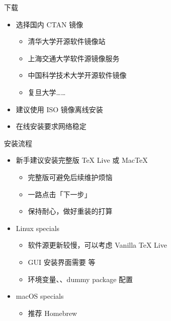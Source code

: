 \begin{frame}{下载}
\begin{itemize}
  \item 选择国内 CTAN 镜像

    \begin{itemize}
      \item 清华大学开源软件镜像站 
      \item 上海交通大学软件源镜像服务 
      \item 中国科学技术大学开源软件镜像  \pause
      \item 复旦大学……
    \end{itemize} \pause

  \item 建议使用 ISO 镜像离线安装
  \item 在线安装要求网络稳定
\end{itemize}
\end{frame}

\begin{frame}{安装流程}
\begin{itemize}
  \item 新手建议安装完整版 \TeX{} Live 或 Mac\TeX{}

    \begin{itemize}
      \item 完整版可避免后续维护烦恼
      \item 一路点击「下一步」
      \item 保持耐心，做好重装的打算
    \end{itemize}

  \item<+-> Linux specials

    \begin{itemize}
      \item 软件源更新较慢，可以考虑 Vanilla \TeX{} Live
      \item GUI 安装界面需要  等
      \item 环境变量、、dummy package 配置
    \end{itemize}

  \item<+-> macOS specials

    \begin{itemize}
      \item 推荐 Homebrew \href{https://brew.sh/}{\faBeer}
    \end{itemize}
\end{itemize}
\end{frame}

